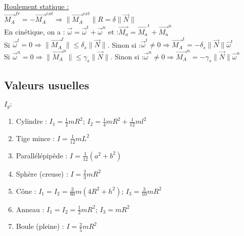 \documentclass[../main.tex]{subfiles}
\begin{document}
\quad \underline{Roulement statique :}\\
$\vec{M_A}^{fr} = -\vec{M_A}^{ext} \Rightarrow \parallel \vec{M_A}^{ext} \parallel R = \delta \parallel \vec{N} \parallel$\\

En cinétique, on a : $\vec{\omega} = \vec{\omega}^t + \vec{\omega}^n$ et :$\vec{M_a} = \vec{M_a}^t + \vec{M_a}^n$\\
Si $\vec{\omega}^t = 0 \Rightarrow \parallel \vec{M_A}^t\parallel \leq \delta_s \parallel \vec{N} \parallel$. Sinon si :$\vec{\omega}^t \neq 0 \Rightarrow \vec{M_A}^t = -\delta_s \parallel \vec{N} \parallel \hat{\omega}^t$\\
Si $\vec{\omega}^n = 0 \Rightarrow \parallel \vec{M_A}^n\parallel \leq \gamma_s \parallel \vec{N} \parallel$. Sinon si :$\vec{\omega}^n \neq 0 \Rightarrow \vec{M_A}^n = -\gamma_s \parallel \vec{N} \parallel \hat{\omega}^n$\\


\subsection{Valeurs usuelles}
$I_g :$ 
\begin{enumerate}
    \item Cylindre : $I_1 = \frac{1}{2} m R^2$; $I_2 = \frac{1}{4}mR^2 + \frac{1}{12}ml^2$\\
    \item Tige mince : $I = \frac{1}{12}mL^2$\\
    \item Parallélépipède : $I=\frac{1}{12} (a^2+b^2)$\\
    \item Sphère (creuse) : $I = \frac{2}{3}mR^2$\\
    \item Cône : $I_1 = I_2 = \frac{3}{80} m (4R^2+h^2)$; $I_3 = \frac{3}{10} mR^2$\\
    \item Anneau : $I_1 = I_2 = \frac{1}{2}mR^2$; $I_3 = mR^2$\\
    \item Boule (pleine) : $I = \frac{2}{5}mR^2$\\
\end{enumerate}
\end{document}
